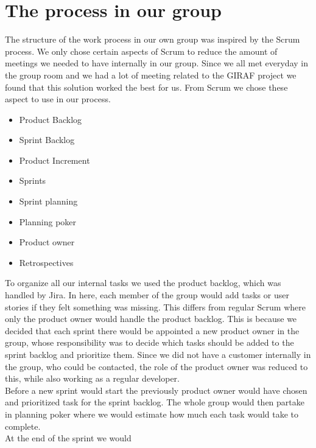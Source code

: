 \section{The process in our group}

The structure of the work process in our own group was inspired by the Scrum process.
We only chose certain aspects of Scrum to reduce the amount of meetings we needed to have internally in our group. 
Since we all met everyday in the group room and we had a lot of meeting related to the GIRAF project we found that this solution worked the best for us.
From Scrum we chose these aspect to use in our process.

 \begin{itemize}
    \item Product Backlog
    \item Sprint Backlog
    \item Product Increment
    \item Sprints
    \item Sprint planning
    \item Planning poker
    \item Product owner
    \item Retrospectives
 \end{itemize}

 To organize all our internal tasks we used the product backlog, which was handled by Jira.
 In here, each member of the group would add tasks or user stories if they felt something was missing.
 This differs from regular Scrum where only the product owner would handle the product backlog.
 This is because we decided that each sprint there would be appointed a new product owner in the group, whose responsibility was to decide which tasks should be added to the sprint backlog and prioritize them.
 Since we did not have a customer internally in the group, who could be contacted, the role of the product owner was reduced to this, while also working as a regular developer.
 \\
 Before a new sprint would start the previously product owner would have chosen and prioritized task for the sprint backlog.
 The whole group would then partake in planning poker where we would estimate how much each task would take to complete.
 \\
 At the end of the sprint we would 

